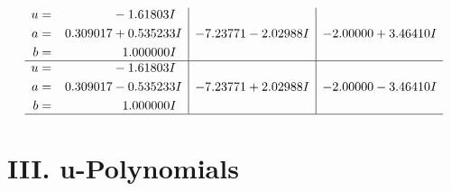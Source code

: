 \documentclass[1p]{elsarticle_modified}
\theoremstyle{definition}
\begin{document}
$$\begin{array}{c|c|c}
\begin{aligned}
u &= \phantom{-0.000000 } -1.61803 I \\
a &= \phantom{-}0.309017 + 0.535233 I \\
b &= \phantom{-0.000000 -}1.000000 I\end{aligned}
 & -7.23771 - 2.02988 I & -2.00000 + 3.46410 I \\ \hline\begin{aligned}
u &= \phantom{-0.000000 } -1.61803 I \\
a &= \phantom{-}0.309017 - 0.535233 I \\
b &= \phantom{-0.000000 -}1.000000 I\end{aligned}
 & -7.23771 + 2.02988 I & -2.00000 - 3.46410 I\\
 \hline 
 \end{array}$$\newpage
\newpage\renewcommand{\arraystretch}{1}
\centering \section*{ III. u-Polynomials}
\end{document}
